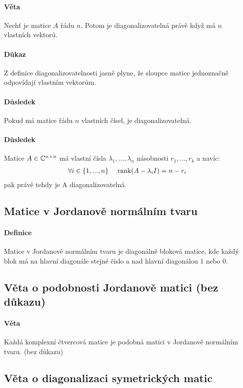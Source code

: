 \documentclass[a4paper,10pt]{article}
\begin{document}
\paragraph{Věta}
Nechť je matice $A$ řádu $n$. Potom je diagonalizovatelná právě když má $n$ vlastních
vektorů.
\paragraph{Důkaz}
Z definice diagonalizovatelnosti jasně plyne, že sloupce matice jednoznačně
odpovídají vlastním vektorům.
\paragraph{Důsledek}
Pokud má matice řádu $n$ vlastních čísel, je diagonalizovatelná.
\paragraph{Důsledek}
Matice $A \in \mathbb{C}^{n \times n}$ má vlastní čísla $\lambda_1, ..., \lambda_n$ násobnosti
$r_1, ..., r_k$ a navíc:
\begin{align*}
	\forall i \in \{1, ..., n\} \quad \operatorname*{\,rank}(A - \lambda_i I) = n - r_i
\end{align*}
pak právě tehdy je A diagonalizovatelná.

\subsection{Matice v Jordanově normálním tvaru}
\setcounter{equation}{0}
\paragraph{Definice}
Matice v Jordanově normálním tvaru je diagonálně bloková matice, kde každý blok má na hlavní
diagonále stejné číslo a nad hlavní diagonálou $1$ nebo $0$.

\subsection{Věta o podobnosti Jordanově matici (bez důkazu)}
\setcounter{equation}{0}
\paragraph{Věta}
Každá komplexní čtvercová matice je podobná matici v Jordanově normálním tvaru.
(bez důkazu)

\subsection{Věta o diagonalizaci symetrických matic}
\setcounter{equation}{0}
\end{document}
